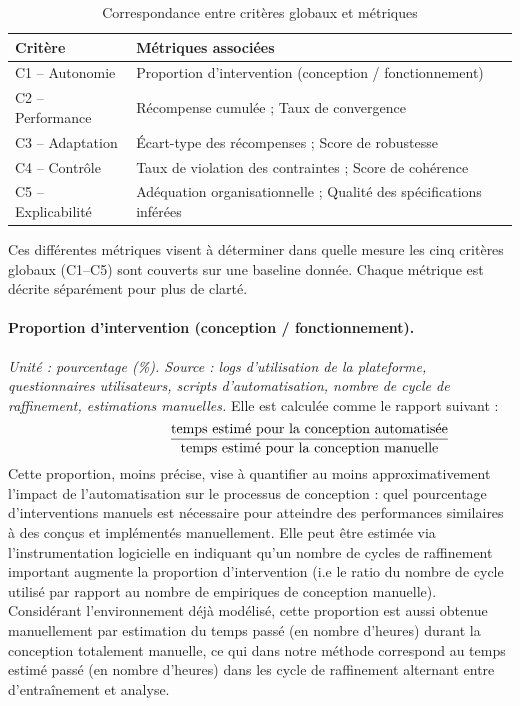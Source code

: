 \begin{table}[h!]
  \centering
  \caption{Correspondance entre critères globaux et métriques}
  \renewcommand{\arraystretch}{1.2}
  \begin{tabular}{ll}
    \hline
    \textbf{Critère}   & \textbf{Métriques associées}                                       \\
    \hline
    C1 – Autonomie     & Proportion d'intervention (conception / fonctionnement)            \\
    C2 – Performance   & Récompense cumulée ; Taux de convergence                           \\
    C3 – Adaptation    & Écart-type des récompenses ; Score de robustesse                   \\
    C4 – Contrôle      & Taux de violation des contraintes ; Score de cohérence             \\
    C5 – Explicabilité & Adéquation organisationnelle ; Qualité des spécifications inférées \\
    \hline
  \end{tabular}
  \label{tab:grille}
\end{table}

Ces différentes métriques visent à déterminer dans quelle mesure les cinq critères globaux (C1--C5) sont couverts sur une baseline donnée.
Chaque métrique est décrite séparément pour plus de clarté.

\paragraph{Proportion d'intervention (conception / fonctionnement).}
\textit{Unité : pourcentage (\%). Source : logs d'utilisation de la plateforme, questionnaires utilisateurs, scripts d'automatisation, nombre de cycle de raffinement, estimations manuelles.}
Elle est calculée comme le rapport suivant :
\[
  \hspace{2.5cm}\frac{\text{temps estimé pour la conception automatisée}}{\text{temps estimé pour la conception manuelle}}
\]
Cette proportion, moins précise, vise à quantifier au moins approximativement l'impact de l'automatisation sur le processus de conception : quel pourcentage d'interventions manuels est nécessaire pour atteindre des performances similaires à des  conçus et implémentés manuellement. Elle peut être estimée via l'instrumentation logicielle en indiquant qu'un nombre de cycles de raffinement important augmente la proportion d'intervention (i.e le ratio du nombre de cycle utilisé par rapport au nombre de  empiriques de conception manuelle). Considérant l'environnement déjà modélisé, cette proportion est aussi obtenue manuellement par estimation du temps passé (en nombre d'heures) durant la conception totalement manuelle, ce qui dans notre méthode correspond au temps estimé passé (en nombre d'heures) dans les cycle de raffinement alternant entre d'entraînement et analyse.

